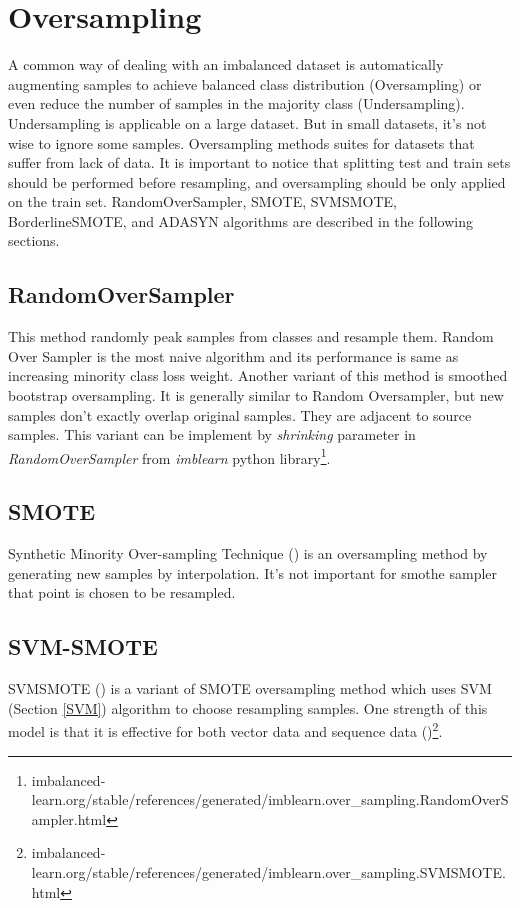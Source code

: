 \section{Oversampling}
\label{lr:oversampling}
A common way of dealing with an imbalanced dataset is automatically augmenting samples to achieve balanced class distribution (Oversampling) or even reduce the number of samples in the majority class (Undersampling). Undersampling is applicable on a large dataset. But in small datasets, it's not wise to ignore some samples. Oversampling methods suites for datasets that suffer from lack of data. It is important to notice that splitting test and train sets should be performed before resampling, and oversampling should be only applied on the train set. RandomOverSampler, SMOTE, SVMSMOTE, BorderlineSMOTE, and ADASYN algorithms are described in the following sections.

\subsection{RandomOverSampler} 
This method randomly peak samples from classes and resample them. Random Over Sampler is the most naive algorithm and its performance is same as increasing minority class loss weight. Another variant of this method is smoothed bootstrap oversampling. It is generally similar to Random Oversampler, but new samples don't exactly overlap original samples. They are adjacent to source samples. This variant can be implement by \textit{shrinking} parameter in \textit{RandomOverSampler} from \textit{imblearn} python library\footnote{imbalanced-learn.org/stable/references/generated/imblearn.over\_sampling.RandomOverSampler.html}. 
	
\subsection{SMOTE}
Synthetic Minority Over-sampling Technique (\cite{smothe}) is an oversampling method by generating new samples by interpolation. It's not important for smothe sampler that point is chosen to be resampled. 
	
\subsection{SVM-SMOTE } 
SVMSMOTE (\cite{svmsmothe}) is a variant of SMOTE oversampling method which uses SVM (Section \ref{SVM}) algorithm to choose resampling samples. One strength of this model is that it is effective for both vector data and sequence data (\cite{svmsmothe})\footnote{imbalanced-learn.org/stable/references/generated/imblearn.over\_sampling.SVMSMOTE.html}.
	
